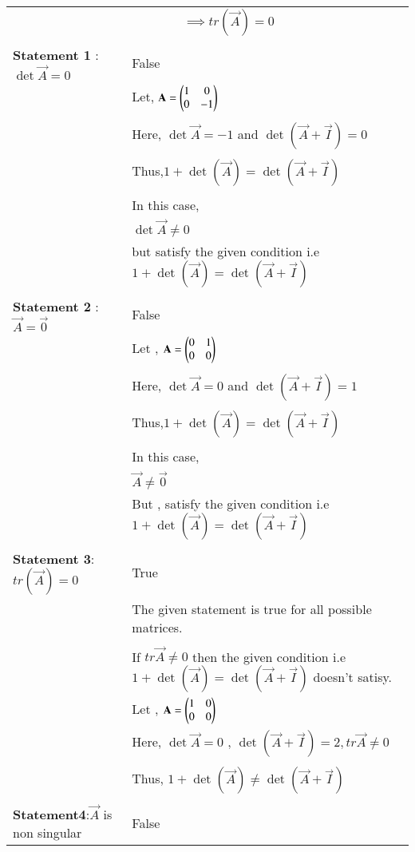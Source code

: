 \begin{longtable}{|p{5cm}|p{13cm}|}
    &$\qquad\qquad\implies\boxed{ tr(\vec{A})=0}$\\
    &\\
    \hline
    \multirow{3}{*}{\textbf{Statement 1} : $\det\vec{A}=0$ } 
	& \\
	& False\\
	\hline
	&\\
	& Let, $\mathbf{A}=\begin{pmatrix}1&0\\0&-1\end{pmatrix}$\\
	&\\
	& Here, $\det{\vec{A}}=-1$ and $\det(\vec{A}+\vec{I})=0$\\
	&\\
	& Thus,$1+\det(\vec{A})=\det(\vec{A}+\vec{I})$\\
	&\\
	& In this case, \\
	& $\det\vec{A}\neq 0$\\ 
	&but satisfy the given condition i.e $1+\det(\vec{A})=\det(\vec{A}+\vec{I})$\\ 
	&\\
	\hline
	\multirow{3}{*}{\textbf{Statement 2} : $\vec{A}=\vec{0}$} & \\
	& False\\
	\hline
	&\\
	& Let , $\mathbf{A}= \begin{pmatrix}0&1\\0&0\end{pmatrix}$\\
	&\\
	& Here, $\det{\vec{A}}=0$ and $\det(\vec{A}+\vec{I})=1$\\
	&\\
	& Thus,$1+\det(\vec{A})=\det(\vec{A}+\vec{I})$\\
	&\\
	& In this case, \\
	& $\vec{A}\neq \vec{0}$\\ 
	& But , satisfy the given condition i.e $ 1+\det(\vec{A})=\det(\vec{A}+\vec{I})$\\
	&\\
	\hline
	\multirow{3}{*}{\textbf{Statement 3}: $tr(\vec{A})=0$}&\\
    & True\\
	\hline
	&\\
	& The given statement is true for all possible matrices.\\
	&\\
	& If $tr\vec{A}\neq0$ then the given condition i.e $1
	+\det(\vec{A})=\det(\vec{A}+\vec{I})$ doesn't satisy.\\
	& Let , $\mathbf{A}= \begin{pmatrix}1&0\\0&0\end{pmatrix}$\\
	\hline
	& Here, $\det{\vec{A}}=0$ , $\det(\vec{A}+\vec{I})=2 , tr{\vec{A}} \neq 0$\\
	&\\
	& Thus, $ 1+\det(\vec{A})\neq\det(\vec{A}+\vec{I})$\\
	&\\
	\hline
	\multirow{3}{*}{\textbf{Statement4}:$\vec{A}$ is non singular} &\\
    & False\\
	\hline
	&\\


\end{longtable}
